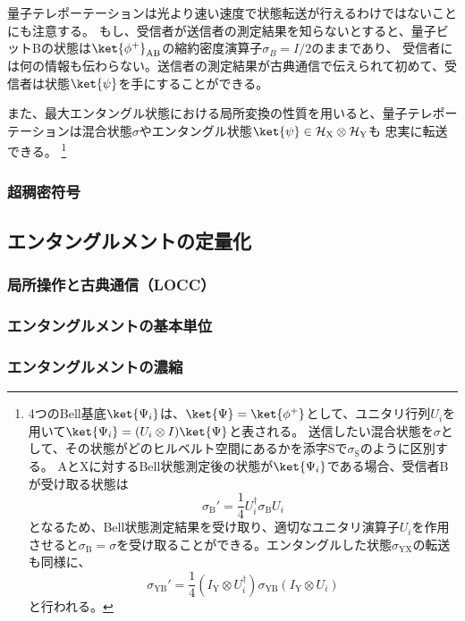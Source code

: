 \documentclass[a4paper,11pt,uplatex]{jsarticle}%
\begin{document}
量子テレポーテーションは光より速い速度で状態転送が行えるわけではないことにも注意する。
もし、受信者が送信者の測定結果を知らないとすると、量子ビットBの状態は$\ket{\phi^{+}}_{\text{AB}}$の縮約密度演算子$\sigma_{B} = I/2$のままであり、
受信者には何の情報も伝わらない。送信者の測定結果が古典通信で伝えられて初めて、受信者は状態$\ket{\psi}$を手にすることができる。

また、最大エンタングル状態における局所変換の性質を用いると、量子テレポーテーションは混合状態$\sigma$やエンタングル状態$\ket{\psi}\in\mathcal{H}_{\text{X}}\otimes\mathcal{H}_{\text{Y}}$も
忠実に転送できる。
\footnote{
4つのBell基底$\ket{\Psi_i}$は、$\ket{\Psi} = \ket{\phi^+}$として、ユニタリ行列$U_i$を用いて$\ket{\Psi_i} = (U_i\otimes I)\ket{\Psi}$と表される。
送信したい混合状態を$\sigma$として、その状態がどのヒルベルト空間にあるかを添字$\text{S}$で$\sigma_{\text{S}}$のように区別する。
AとXに対するBell状態測定後の状態が$\ket{\Psi_i}$である場合、受信者Bが受け取る状態は
\begin{equation}
  \sigma_\text{B}' = \frac{1}{4}U^{\dagger}_i \sigma_\text{B}U_i
\end{equation}
となるため、Bell状態測定結果を受け取り、適切なユニタリ演算子$U_i$を作用させると$\sigma_{\text{B}} = \sigma$を受け取ることができる。エンタングルした状態$\sigma_{\text{YX}}$の転送も同様に、
\begin{equation}
  \sigma_{\text{YB}}' = \frac{1}{4}(I_{\text{Y}}\otimes U^{\dagger}_i) \sigma_{\text{YB}}(I_{\text{Y}}\otimes U_i)
\end{equation}
と行われる。
}
\newpage

\subsubsection{超稠密符号}

\subsection{エンタングルメントの定量化}

\subsubsection{局所操作と古典通信（LOCC）}

\subsubsection{エンタングルメントの基本単位}

\subsubsection{エンタングルメントの濃縮}
\end{document}

